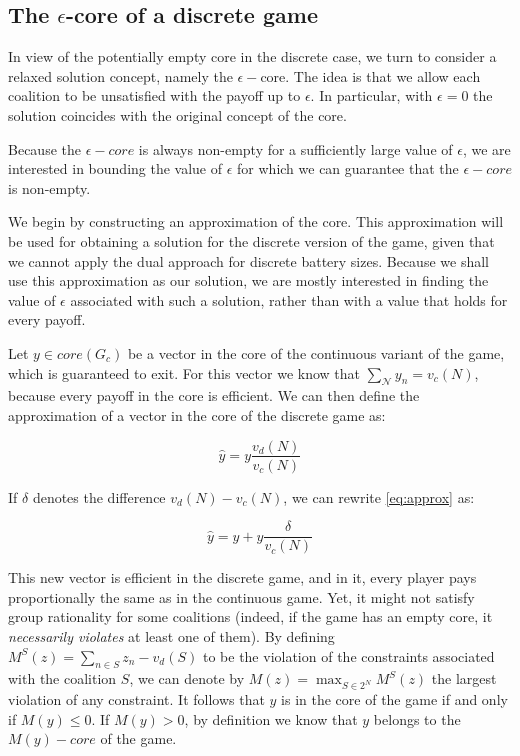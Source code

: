 \documentclass[sigconf, table]{acmart}
\begin{document}
\subsection{The $\epsilon$-core of a discrete game}\label{sec:approx}

In view of the potentially empty core in the discrete case, we turn to consider 
a relaxed solution concept, namely the $\epsilon-$core. The idea is that we allow each coalition to be unsatisfied with the payoff up to $\epsilon$. In particular, with  $\epsilon = 0$ the solution coincides with the original concept of the core.

Because the $\epsilon-core$ is always non-empty for a sufficiently large value of $\epsilon$, we are interested in bounding the value of $\epsilon$ for which we can guarantee that the $\epsilon-core$ is non-empty.

We begin by constructing an approximation of the core. This approximation will be used for obtaining a solution for the discrete version of the game, given that we cannot apply the dual approach for discrete battery sizes. Because we shall use this approximation as our solution, we are mostly interested in finding the value of $\epsilon$ associated with such a solution, rather than with a value that holds for every payoff.


Let $y \in core(G_c)$ be a vector in the core of the continuous variant of the game, which is guaranteed to exit. For this vector we know that $\sum_{\mathcal{N}} y_n  = v_c(N)$, because every payoff in the core is efficient. 
We can then define the approximation of a vector in the core of the discrete game as:

\begin{equation}\label{eq:approx}
 \hat{y} = y \frac{v_d(N)}{v_c(N)}
\end{equation}

If $\delta$ denotes the difference $v_d(N) - v_c(N)$, we can rewrite \eqref{eq:approx} as:

\begin{equation}\label{eq:re-approx}
 \hat{y} = y +  y\frac{\delta}{v_c(N)}
\end{equation}

This new vector is efficient in the discrete game, and in it, every player pays proportionally the same as in the continuous game. Yet, it might not satisfy group rationality for some coalitions (indeed, if the game has an empty core, it {\em necessarily violates} at least one of them).
By defining $M^S(z) = \sum_{n \in S} z_n - v_d(S)$ to be the violation of the constraints associated with the coalition $S$, we can denote by $M(z) = \max_{S \in 2^N} M^S(z)$ the largest violation of any constraint. It follows that $y$ is in the core of the game if and only if $M(y) \leq 0$. If $M(y) > 0$, by definition we know that $y$ belongs to the $M(y)-core$ of the game.
\end{document}
